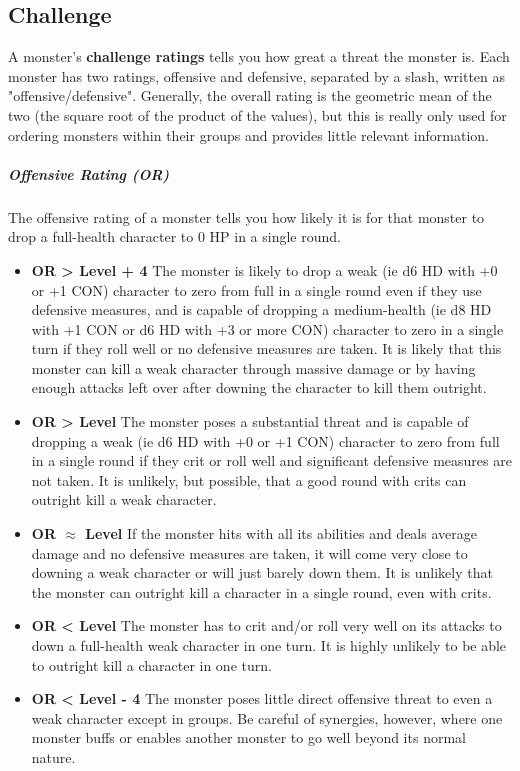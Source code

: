 \subsection{Challenge}

A monster's \textbf*{challenge ratings} tells you how great a threat the monster is. Each monster has two ratings, offensive and defensive, separated by a slash, written as "offensive/defensive". Generally, the overall rating is the geometric mean of the two (the square root of the product of the values), but this is really only used for ordering monsters within their groups and provides little relevant information.

\subparagraph*{Offensive Rating (OR)} The offensive rating of a monster tells you how likely it is for that monster to drop a full-health character to 0 HP in a single round.

\begin{itemize}
	\item[] \textbf{OR > Level + 4} The monster is likely to drop a weak (ie d6 HD with +0 or +1 CON) character to zero from full in a single round even if they use defensive measures, and is capable of dropping a medium-health (ie d8 HD with +1 CON or d6 HD with +3 or more CON) character to zero in a single turn if they roll well or no defensive measures are taken. It is likely that this monster can kill a weak character through massive damage or by having enough attacks left over after downing the character to kill them outright.
	\item[] \textbf{OR > Level} The monster poses a substantial threat and is capable of dropping a weak (ie d6 HD with +0 or +1 CON) character to zero from full in a single round if they crit or roll well and significant defensive measures are not taken. It is unlikely, but possible, that a good round with crits can outright kill a weak character.
	\item[] \textbf{OR $\approx$ Level} If the monster hits with all its abilities and deals average damage and no defensive measures are taken, it will come very close to downing a weak character or will just barely down them. It is unlikely that the monster can outright kill a character in a single round, even with crits.
	\item[] \textbf{OR < Level} The monster has to crit and/or roll very well on its attacks to down a full-health weak character in one turn. It is highly unlikely to be able to outright kill a character in one turn.
	\item[] \textbf{OR < Level - 4} The monster poses little direct offensive threat to even a weak character except in groups. Be careful of synergies, however, where one monster buffs or enables another monster to go well beyond its normal nature.
\end{itemize}

